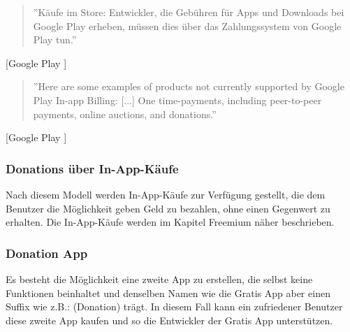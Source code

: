 \documentclass[FIPLY_base.tex]{subfiles}
\begin{document}
\begin{quote}
''Käufe im Store: Entwickler, die Gebühren für Apps und Downloads bei Google Play erheben, müssen dies über das Zahlungssystem von Google Play tun.''
\end{quote}[Google Play \cite{gpDevContentPolicy}]

\begin{quote}
''Here are some examples of products not currently supported by Google Play In-app Billing: [...]
One time-payments, including peer-to-peer payments, online auctions, and donations.''
\end{quote}[Google Play \cite{gpInAppBilling}]
\ \\
\subsubsection{Donations über In-App-Käufe}
Nach diesem Modell werden In-App-Käufe zur Verfügung gestellt, die dem Benutzer die Möglichkeit geben Geld zu bezahlen, ohne einen Gegenwert zu erhalten. 
Die In-App-Käufe werden im Kapitel Freemium näher beschrieben.
\ \\
\subsubsection{Donation App}
Es besteht die Möglichkeit eine zweite App zu erstellen, die selbst keine Funktionen beinhaltet und denselben Namen wie die Gratis App aber einen Suffix wie z.B.: (Donation) trägt.
In diesem Fall kann ein zufriedener Benutzer diese zweite App kaufen und so die Entwickler der Gratis App unterstützen.
\end{document}
